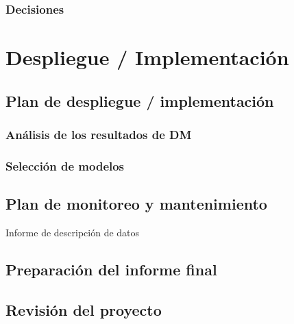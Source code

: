 \documentclass[11pt,a4paper,twoside]{tesis}
\begin{document}
\subsection{Decisiones}


\chapter{Despliegue / Implementación}
\section{Plan de despliegue / implementación}
\subsection{Análisis de los resultados de DM}
\subsection{Selección de modelos}
\section{Plan de monitoreo y mantenimiento}
Informe de descripción de datos
\section{Preparación del informe final}
\section{Revisión del proyecto}



\backmatter
%
\end{document}
